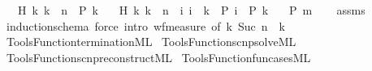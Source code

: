 \begin{isabellebody}
\ \ \ H{}{\isacharcolon}{\kern0pt}\ {\isachardoublequoteopen}{\isasymAnd}k{\isachardot}{\kern0pt}\ k\ {\isachargreater}{\kern0pt}\ n\ {\isasymLongrightarrow}\ P\ k{\isachardoublequoteclose}\isanewline
\ \ \ H{}{\isacharcolon}{\kern0pt}\ {\isachardoublequoteopen}{\isasymAnd}k{\isachardot}{\kern0pt}\ k\ {\isasymle}\ n\ {\isasymLongrightarrow}\ {\isacharparenleft}{\kern0pt}{\isasymAnd}i{\isachardot}{\kern0pt}\ i\ {\isachargreater}{\kern0pt}\ k\ {\isasymLongrightarrow}\ P\ i{\isacharparenright}{\kern0pt}\ {\isasymLongrightarrow}\ P\ k{\isachardoublequoteclose}\isanewline
\ \ \ {\isachardoublequoteopen}P\ m{\isachardoublequoteclose}\isanewline
%
\isadelimproof
\ \ %
\endisadelimproof
%
\isatagproof
{}\isamarkupfalse%
\ assms\ \isamarkupfalse%
\ induction{\isacharunderscore}{\kern0pt}schema\ {\isacharparenleft}{\kern0pt}force\ intro{\isacharbang}{\kern0pt}{\isacharcolon}{\kern0pt}\ wf{\isacharunderscore}{\kern0pt}measure\ {\isacharbrackleft}{\kern0pt}of\ {\isachardoublequoteopen}{\isasymlambda}k{\isachardot}{\kern0pt}\ Suc\ n\ {\isacharminus}{\kern0pt}\ k{\isachardoublequoteclose}{\isacharbrackright}{\kern0pt}{\isacharparenright}{\kern0pt}{\isacharplus}{\kern0pt}%
\endisatagproof
{\isafoldproof}%
%
\isadelimproof
%
\endisadelimproof
%
\isadelimdocument
%
\endisadelimdocument
%
\isatagdocument
%
\isamarkuptrue%
%
\endisatagdocument
{\isafolddocument}%
%
\isadelimdocument
%
\endisadelimdocument
%
\isadelimML
%
\endisadelimML
%
\isatagML
{}\isamarkupfalse%
\ {\isacartoucheopen}Tools{\isacharslash}{\kern0pt}Function{\isacharslash}{\kern0pt}termination{\isachardot}{\kern0pt}ML{\isacartoucheclose}\isanewline
{}\isamarkupfalse%
\ {\isacartoucheopen}Tools{\isacharslash}{\kern0pt}Function{\isacharslash}{\kern0pt}scnp{\isacharunderscore}{\kern0pt}solve{\isachardot}{\kern0pt}ML{\isacartoucheclose}\isanewline
{}\isamarkupfalse%
\ {\isacartoucheopen}Tools{\isacharslash}{\kern0pt}Function{\isacharslash}{\kern0pt}scnp{\isacharunderscore}{\kern0pt}reconstruct{\isachardot}{\kern0pt}ML{\isacartoucheclose}\isanewline
{}\isamarkupfalse%
\ {\isacartoucheopen}Tools{\isacharslash}{\kern0pt}Function{\isacharslash}{\kern0pt}fun{\isacharunderscore}{\kern0pt}cases{\isachardot}{\kern0pt}ML{\isacartoucheclose}\isanewline
\isanewline
{}\isamarkupfalse%

\end{isabellebody}
